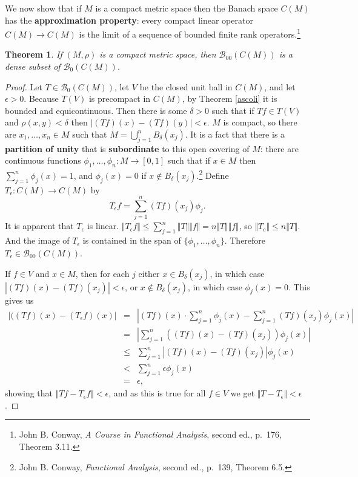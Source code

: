 \documentclass{article}
\newcommand{\norm}[1]{\Vert #1 \Vert}
\newtheorem{theorem}{Theorem}
\begin{document}
We now show that if $M$ is a compact metric space then the Banach space $C(M)$ has the \textbf{approximation property}: every compact linear operator 
$C(M) \to C(M)$ is the limit of a sequence of bounded finite
rank operators.\footnote{John B. Conway, {\em A Course in Functional Analysis}, second ed., p.~176, Theorem 3.11.}



\begin{theorem}
If $(M,\rho)$ is a compact metric space, then $\mathscr{B}_{00}(C(M))$ is a dense subset of $\mathscr{B}_0(C(M))$.
\end{theorem}
\begin{proof}
Let $T \in \mathscr{B}_0(C(M))$,  let $V$ be the closed unit ball in $C(M)$, and let $\epsilon>0$. Because $T(V)$ is precompact in $C(M)$, by Theorem \ref{ascoli} it is bounded and equicontinuous. Then there is some $\delta>0$ such that if $Tf \in T(V)$ and $\rho(x,y)<\delta$ then
$|(Tf)(x)-(Tf)(y)|<\epsilon$. $M$ is compact, so there are $x_1,\ldots,x_n \in M$ such that $M = \bigcup_{j=1}^n B_\delta(x_j)$.
It is a fact that there is a \textbf{partition of unity} that is \textbf{subordinate} to this open covering of $M$: there are continuous functions
$\phi_1,\ldots,\phi_n:M \to [0,1]$ such that if $x \in M$ then $\sum_{j=1}^n \phi_j(x)=1$, and $\phi_j(x)=0$ if $x \not \in B_\delta(x_j)$.\footnote{John 
B. Conway, {\em Functional Analysis}, second ed., p.~139, Theorem 6.5.}
Define $T_\epsilon:C(M) \to C(M)$ by
\[
T_\epsilon f = \sum_{j=1}^n (Tf)(x_j) \phi_j.
\]
It is apparent that $T_\epsilon$ is linear. $\norm{T_\epsilon f} \leq \sum_{j=1}^n \norm{T} \norm{f}=n \norm{T} \norm{f}$, so $\norm{T_e} \leq n\norm{T}$.
And the image of $T_\epsilon$ is contained in the span of $\{\phi_1,\ldots,\phi_n\}$. Therefore $T_\epsilon \in \mathscr{B}_{00}(C(M))$.

If $f \in V$ and $x \in M$, then for each $j$ either $x \in B_\delta(x_j)$, in which case $|(Tf)(x)-(Tf)(x_j)|<\epsilon$, or $x \not \in B_\delta(x_j)$,
in which case $\phi_j(x)=0$. This gives us
\begin{eqnarray*}
|((Tf)(x)-(T_\epsilon f)(x)|&=& \left|  (Tf)(x)\cdot \sum_{j=1}^n \phi_j(x) - \sum_{j=1}^n (Tf)(x_j) \phi_j(x) \right|\\
&=&\left| \sum_{j=1}^n \left( (Tf)(x) - (Tf)(x_j) \right) \phi_j(x) \right|\\
&\leq&\sum_{j=1}^n \left|  (Tf)(x) - (Tf)(x_j) \right| \phi_j(x) \\
&<&\sum_{j=1}^n \epsilon \phi_j(x)\\
&=&\epsilon,
\end{eqnarray*}
showing that $\norm{Tf - T_\epsilon f} < \epsilon$, and as this is true for all $f \in V$ we get  $\norm{T-T_\epsilon}<\epsilon$.
\end{proof}
\end{document}
